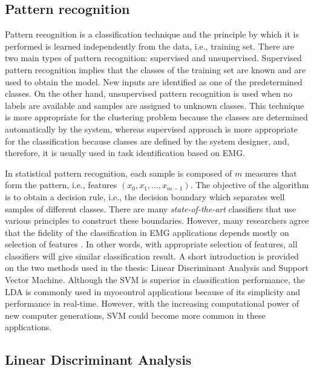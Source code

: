 \newpage
{}
{}

\begin{appendix}
\chapter{Pattern recognition}
Pattern recognition is a classification technique and the principle by which it is performed is learned independently from the data, i.e., training set. There are two main types of pattern recognition: supervised and unsupervised. Supervised pattern recognition implies that the classes of the training set are known and are used to obtain the model. New inputs are identified as one of the predetermined classes. On the other hand, unsupervised pattern recognition is used when no labels are available and samples are assigned to unknown classes. This technique is more appropriate for the clustering problem because the classes are determined automatically by the system, whereas supervised approach is more appropriate for the classification because classes are defined by the system designer, and, therefore, it is usually used in task identification based on EMG.

In statistical pattern recognition, each sample is composed of $m$ measures that form the pattern, i.e., features $(x_0, x_1, \dots, x_{m-1})$. The objective of the algorithm is to obtain a decision rule, i.e., the decision boundary which separates well samples of different classes. There are many \emph{state-of-the-art} classifiers that use various principles to construct these boundaries. However, many researchers agree that the fidelity of the classification in EMG applications depends mostly on selection of features \citep{Hakonen2015}. In other words, with appropriate selection of features, all classifiers will give similar classification result. A short introduction is provided on the two methods used in the thesis: Linear Discriminant Analysis and Support Vector Machine. Although the SVM is superior in classification performance, the LDA is commonly used in myocontrol applications because of its simplicity and performance in real-time. However, with the increasing computational power of new computer generations, SVM could become more common in these applications. 


\section{Linear Discriminant Analysis}


\end{appendix}
